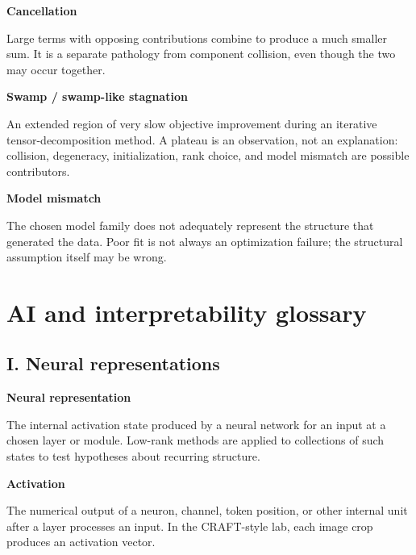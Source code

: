 \documentclass[10pt]{article}
\newenvironment{glossaryentry}[1]{%
  \par\medskip\noindent
  {\large\bfseries #1}\par\smallskip
}{\par\medskip}
\begin{document}
\begin{glossaryentry}{Cancellation}
Large terms with opposing contributions combine to produce a much smaller sum. It is a separate pathology from component collision, even though the two may occur together.

\end{glossaryentry}


\begin{glossaryentry}{Swamp / swamp-like stagnation}
An extended region of very slow objective improvement during an iterative tensor-decomposition method. A plateau is an observation, not an explanation: collision, degeneracy, initialization, rank choice, and model mismatch are possible contributors.
\par\smallskip{\small\color{muted}[KB09]}
\end{glossaryentry}


\begin{glossaryentry}{Model mismatch}
The chosen model family does not adequately represent the structure that generated the data. Poor fit is not always an optimization failure; the structural assumption itself may be wrong.

\end{glossaryentry}


\newpage
\section{AI and interpretability glossary}

\subsection{I. Neural representations}

\begin{glossaryentry}{Neural representation}
The internal activation state produced by a neural network for an input at a chosen layer or module. Low-rank methods are applied to collections of such states to test hypotheses about recurring structure.
\par{}
\end{glossaryentry}


\begin{glossaryentry}{Activation}
The numerical output of a neuron, channel, token position, or other internal unit after a layer processes an input. In the CRAFT-style lab, each image crop produces an activation vector.
\par\smallskip{\small\color{muted}[FEL23]}
\end{glossaryentry}
\end{document}
